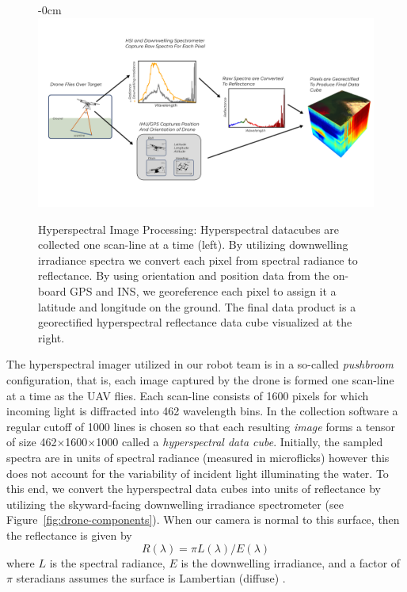 \documentclass[journal,article,submit,pdftex,moreauthors]{Definitions/mdpi}
\begin{document}
\begin{figure}[H]
\begin{adjustwidth}{-\extralength}{0cm}
\centering
\includegraphics[width=16cm]{paper/figures/materials-and-methods/pipeline-figure-2.pdf}
\end{adjustwidth}
\caption{Hyperspectral Image Processing: Hyperspectral datacubes are collected one scan-line at a time (left). By utilizing downwelling irradiance spectra we convert each pixel from spectral radiance to reflectance. By using orientation and position data from the on-board GPS and INS, we georeference each pixel to assign it a latitude and longitude on the ground. The final data product is a georectified hyperspectral reflectance data cube visualized at the right. \label{fig:hsi-pipeline}}
\end{figure}  

The hyperspectral imager utilized in our robot team is in a so-called \textit{pushbroom} configuration, that is, each image captured by the drone is formed one scan-line at a time as the UAV flies. Each scan-line consists of 1600 pixels for which incoming light is diffracted into 462 wavelength bins. In the collection software a regular cutoff of 1000 lines is chosen so that each resulting \textit{image} forms a tensor of size 462$\times$1600$\times$1000 called a \textit{hyperspectral data cube}. Initially, the sampled spectra are in units of spectral radiance (measured in microflicks) however this does not account for the variability of incident light illuminating the water. To this end, we convert the hyperspectral data cubes into units of reflectance by utilizing the skyward-facing downwelling irradiance spectrometer (see Figure~\ref{fig:drone-components}). When our camera is normal to this surface, then the reflectance is given by
\begin{equation}
    R(\lambda) = \pi L(\lambda)/E(\lambda)
\end{equation}
where $L$ is the spectral radiance, $E$ is the downwelling irradiance, and a factor of $\pi$ steradians assumes the surface is Lambertian (diffuse) \cite{reflectance-conversion}.
\end{document}
